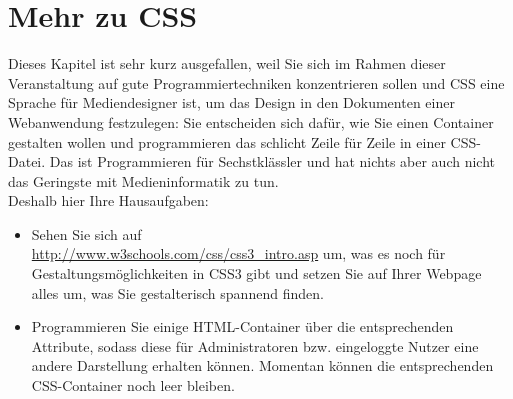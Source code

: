 \section{Mehr zu CSS}

Dieses Kapitel ist sehr kurz ausgefallen, weil Sie sich im Rahmen dieser Veranstaltung auf gute Programmiertechniken konzentrieren sollen und CSS eine Sprache für Mediendesigner ist, um das Design in den Dokumenten einer Webanwendung festzulegen: Sie entscheiden sich dafür, wie Sie einen Container gestalten wollen und programmieren das schlicht Zeile für Zeile in einer CSS-Datei. Das ist Programmieren für Sechstklässler und hat nichts aber auch nicht das Geringste mit Medieninformatik zu tun.\\

Deshalb hier Ihre Hausaufgaben:

\begin{itemize}
	\item Sehen Sie sich auf\\ \url{http://www.w3schools.com/css/css3\_intro.asp} um, was es noch für Gestaltungsmöglichkeiten in CSS3 gibt und setzen Sie auf Ihrer Webpage alles um, was Sie gestalterisch spannend finden.
	
	\item Programmieren Sie einige HTML-Container über die entsprechenden Attribute, sodass diese für Administratoren bzw. eingeloggte Nutzer eine andere Darstellung erhalten können. Momentan können die entsprechenden CSS-Container noch leer bleiben.	
\end{itemize}

